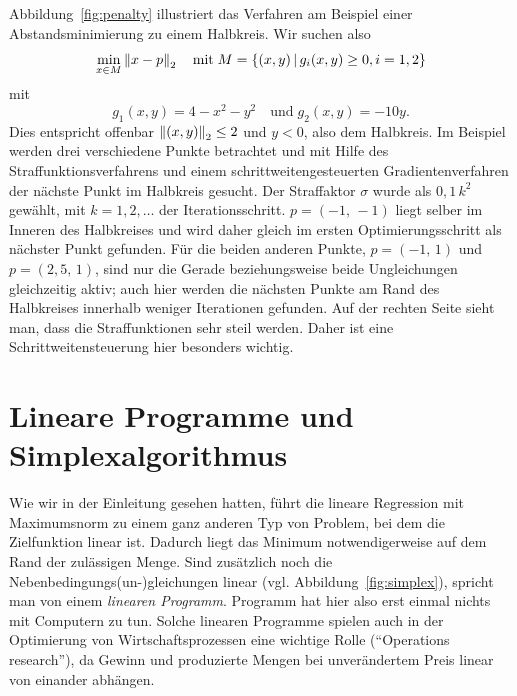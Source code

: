 Abbildung~\ref{fig:penalty} illustriert das Verfahren am Beispiel
einer Abstandsminimierung zu einem Halbkreis. Wir suchen also
\begin{equation}
  \min_{x\in M} \left\lVert{x - p}\right\rVert_2\quad\text{mit}\;
  M = \{ (x,y)\,|\, g_i(x,y) \ge 0, i=1,2 \}
\end{equation}
mit
\begin{equation*}
  g_1(x, y) = 4 - x^2-y^2\quad\text{und}\; g_2(x,y) = -10y.
\end{equation*}
Dies entspricht offenbar $\left\lVert{(x,y)}\right\rVert_2\le 2$ und $y<0$, also dem
Halbkreis. Im Beispiel werden drei verschiedene Punkte betrachtet und
mit Hilfe des Straffunktionsverfahrens und einem
schrittweitengesteuerten Gradientenverfahren der nächste Punkt im
Halbkreis gesucht. Der Straffaktor $\sigma$ wurde als $0,1\,k^2$
gewählt, mit $k=1,2,\ldots$ der Iterationsschritt. $p=(-1,\,-1)$ liegt
selber im Inneren des Halbkreises und wird daher gleich im ersten
Optimierungsschritt als nächster Punkt gefunden. Für die beiden
anderen Punkte, $p=(-1,\,1)$ und $p=(2,5,\,1)$, sind nur die Gerade
beziehungsweise beide Ungleichungen gleichzeitig aktiv; auch hier
werden die nächsten Punkte am Rand des Halbkreises innerhalb weniger
Iterationen gefunden. Auf der rechten Seite sieht man, dass die
Straffunktionen sehr steil werden. Daher ist eine
Schrittweitensteuerung hier besonders wichtig.

\section{Lineare Programme und Simplexalgorithmus}

Wie wir in der Einleitung gesehen hatten, führt die lineare Regression
mit Maximumsnorm zu einem ganz anderen Typ von Problem, bei dem die
Zielfunktion linear ist. Dadurch liegt das Minimum notwendigerweise
auf dem Rand der zulässigen Menge. Sind zusätzlich noch die
Nebenbedingungs(un-)gleichungen linear
(vgl. Abbildung~\ref{fig:simplex}), spricht man von einem
\emph{linearen Programm}. Programm hat hier also erst einmal nichts
mit Computern zu tun. Solche linearen Programme spielen auch in der
Optimierung von Wirtschaftsprozessen eine wichtige Rolle ("`Operations
research"'), da Gewinn und produzierte Mengen bei unverändertem Preis
linear von einander abhängen.

